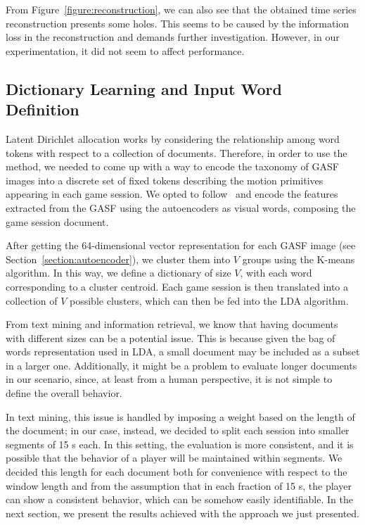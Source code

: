 {From Figure~\ref{figure:reconstruction}, we can also see that the obtained time series reconstruction presents some holes. This seems to be caused by the information loss in the reconstruction and demands further investigation. However, in our experimentation, it did not seem to affect performance. 

\subsection{Dictionary Learning and Input Word Definition}
Latent Dirichlet allocation works by considering the relationship among word tokens with respect to a collection of documents. Therefore, in order to use the method, we needed to come up with a way to encode the taxonomy of GASF images into a discrete set of fixed tokens describing the motion primitives appearing in each game session. We opted to follow~\cite{prince_computer_2012} and encode the features extracted from the GASF using the autoencoders as visual words, composing the game session document.

After getting the 64-dimensional vector representation for each GASF image (see Section~\ref{section:autoencoder}), we cluster them into $V$ groups using the K-means algorithm. In this way, we define a dictionary of size $V$, with each word corresponding to a cluster centroid. Each game session is then translated into a collection of $V$ possible clusters, which can then be fed into the LDA algorithm.

From text mining and information retrieval, we know that having documents with different sizes can be a potential issue. This is because given the bag of words representation used in LDA, a small document may be included as a subset in a larger one. Additionally, it might be a problem to evaluate longer documents in our scenario, since, at least from a human perspective, it is not simple to define the overall behavior.

In text mining, this issue is handled by imposing a weight based on the length of the document; in our case, instead, we decided to split each session into smaller segments of 15 s each. In this setting, the evaluation is more consistent, and it is possible that the behavior of a player will be maintained within segments. We decided this length for each document both for convenience with respect to the window length and from the assumption that in each fraction of 15 s, the player can show a consistent behavior, which can be somehow easily identifiable. In the next section, we present the results achieved with the approach we just presented.

}
